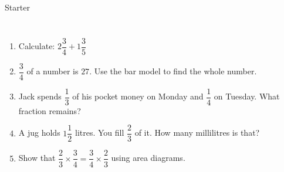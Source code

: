\documentclass{beamer}
\newcommand{\ashow}[1]{\uncover<2->{\textcolor{red}{\small #1}}}
\begin{document}
\begin{frame}{Starter}
\begin{columns}
\begin{enumerate}
  \item Calculate: $2\dfrac{3}{4} + 1\dfrac{3}{5}$ \ashow{$=4\dfrac{7}{20}$}

  \item $\dfrac{3}{4}$ of a number is $27$. Use the bar model to find the whole number. \ashow{$36$}

  \item Jack spends $\dfrac{1}{3}$ of his pocket money on Monday and $\dfrac{1}{4}$ on Tuesday. What fraction remains? \ashow{$\dfrac{5}{12}$}

  \item A jug holds $1\dfrac{1}{2}$ litres. You fill $\dfrac{2}{3}$ of it. How many millilitres is that? \ashow{$1000$ mL}

  \item Show that $\dfrac{2}{3} \times \dfrac{3}{4} = \dfrac{3}{4} \times \dfrac{2}{3}$ using area diagrams.


\end{enumerate}
\end{columns}
\end{frame}
\end{document}

